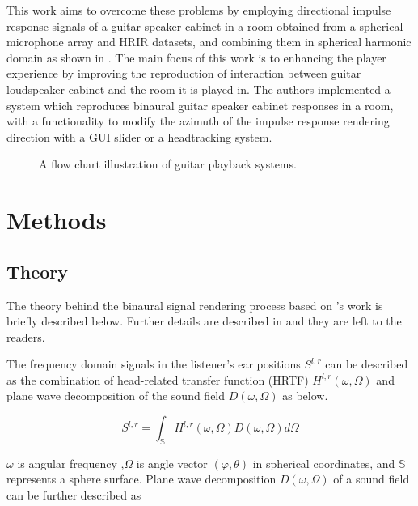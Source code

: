 \documentclass[convention,e-brief]{aesconf-current}
\begin{document}
This work aims to overcome these problems by employing directional impulse response signals of a guitar speaker cabinet in a room obtained from a spherical microphone array and HRIR datasets, and combining them in spherical harmonic domain as shown in \cite{Andersson2017-qg}.
The main focus of this work is to enhancing the player experience by improving the reproduction of interaction between guitar loudspeaker cabinet and the room it is played in.
The authors implemented a system which reproduces binaural guitar speaker cabinet responses in a room, with a functionality to modify the azimuth of the impulse response rendering direction with a GUI slider or a headtracking system.

\begin{figure}
    \begin{center}
        \caption{A flow chart illustration of guitar playback systems. } \label{fig:diag}
    \end{center}
\end{figure}



\section{Methods}

\subsection{Theory}
The theory behind the binaural signal rendering process based on \citet{Andersson2017-qg}'s work is briefly described below.
Further details are described in \cite{Andersson2017-qg} and they are left to the readers.

The frequency domain signals in the listener's ear positions $S^{l, r}$ can be described as the combination of head-related transfer function (HRTF) $H^{l, r}(\omega, \Omega)$ and plane wave decomposition of the sound field $D(\omega, \Omega)$ as below.

\begin{equation}
    \label{hrtf_pw}
    S^{l, r}=\int_{\mathbb{S}} H^{l, r}(\omega, \Omega) D(\omega, \Omega) d \Omega
\end{equation}

$\omega$ is angular frequency ,$\Omega$ is angle vector $(\varphi, \theta)$ in spherical coordinates, and $\mathbb{S}$ represents a sphere surface.
Plane wave decomposition $D(\omega, \Omega)$ of a sound field can be further described as
\end{document}
